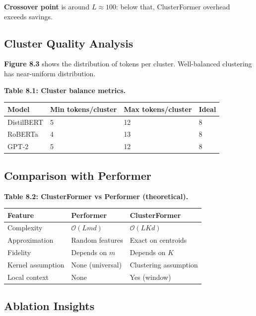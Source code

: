 \textbf{Crossover point} is around $L \approx 100$: below that, ClusterFormer 
overhead exceeds savings.

\subsection{Cluster Quality Analysis}

\textbf{Figure 8.3} shows the distribution of tokens per cluster. Well-balanced 
clustering has near-uniform distribution.

\textbf{Table 8.1: Cluster balance metrics.}

\begin{table}[H]
\centering
\small
\begin{tabular}{llll}
\toprule
\textbf{Model} & \textbf{Min tokens/cluster} & \textbf{Max tokens/cluster} & \textbf{Ideal} \\
\midrule
DistilBERT & 5 & 12 & 8 \\
RoBERTa & 4 & 13 & 8 \\
GPT-2 & 5 & 12 & 8 \\
\bottomrule
\end{tabular}
\end{table}

\subsection{Comparison with Performer}

\textbf{Table 8.2: ClusterFormer vs Performer (theoretical).}

\begin{table}[H]
\centering
\small
\begin{tabular}{lll}
\toprule
\textbf{Feature} & \textbf{Performer} & \textbf{ClusterFormer} \\
\midrule
Complexity & $\mathcal{O}(L m d)$ & $\mathcal{O}(L K d)$ \\
Approximation & Random features & Exact on centroids \\
Fidelity & Depends on $m$ & Depends on $K$ \\
Kernel assumption & None (universal) & Clustering assumption \\
Local context & None & Yes (window) \\
\bottomrule
\end{tabular}
\end{table}

\subsection{Ablation Insights}

